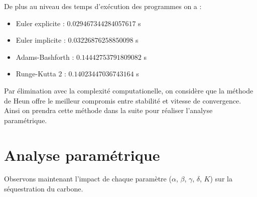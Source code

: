\documentclass[12pt]{article}
\theoremstyle{saav}
\begin{document}
		
		De plus au niveau des temps d'exécution des programmes on a : 
		\begin{itemize}[label*=\textbullet]
			\item \textsf{Euler explicite} : $0.029467344284057617$ s
			\item \textsf{Euler implicite} : $0.03226876258850098$ s 
			\item \textsf{Adams-Bashforth} : $0.14442753791809082$ s
			\item \textsf{Runge-Kutta 2} : $0.14023447036743164$ s
		\end{itemize}
		
		Par élimination avec la complexité computationelle, on considère que la méthode de Heun offre le meilleur compromis entre stabilité et vitesse de convergence. 
		Ainsi on prendra cette méthode dans la suite pour réaliser l'analyse paramétrique.
		
	
	
	
	\section{Analyse paramétrique}
	Observons maintenant l’impact de chaque paramètre ($\alpha$, $\beta$, $\gamma$, $\delta$, $K$) sur la séquestration du carbone.
	
\end{document}

